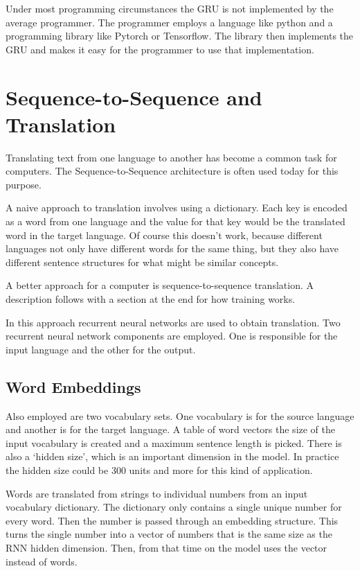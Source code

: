 Under most programming circumstances the GRU is not implemented by the average programmer. The programmer employs a language like python and a programming library like Pytorch or Tensorflow. The library then implements the GRU and makes it easy for the programmer to use that implementation.

\section{Sequence-to-Sequence and Translation}

Translating text from one language to another has become a common task for computers. The Sequence-to-Sequence architecture is often used today for this purpose. %

A naive approach to translation involves using a dictionary. Each key is encoded as a word from one language and the value for that key would be the translated word in the target language. Of course this doesn't work, because different languages not only have different words for the same thing, but they also have different sentence structures for what might be similar concepts.

A better approach for a computer is sequence-to-sequence translation. A description follows with a section at the end for how training works.

In this approach recurrent neural networks are used to obtain translation. Two recurrent neural network components are employed. One is responsible for the input language and the other for the output. 


\subsection{Word Embeddings}

Also employed are two vocabulary sets. One vocabulary is for the source language and another is for the target language. A table of word vectors the size of the input vocabulary is created and a maximum sentence length is picked. There is also a `hidden size', which is an important dimension in the model. In practice the hidden size could be 300 units and more for this kind of application.

Words are translated from strings to individual numbers from an input vocabulary dictionary. The dictionary only contains a single unique number for every word. Then the number is passed through an embedding structure. This turns the single number into a vector of numbers that is the same size as the RNN hidden dimension. Then, from that time on the model uses the vector instead of words.

